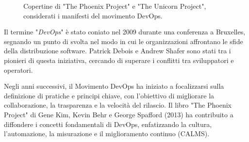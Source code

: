 \begin{figure}[h]
    \centering
    \hspace{30px}
    \caption{Copertine di "The Phoenix Project" e "The Unicorn Project", considerati i manifesti del movimento DevOps.}
    \label{fig:cha1:jerez}
\end{figure}

Il termine "{\em DevOps}" è stato coniato nel 2009 durante una conferenza a Bruxelles, segnando un punto di svolta nel modo in cui le organizzazioni affrontano le sfide della distribuzione software. Patrick Debois e Andrew Shafer sono stati tra i pionieri di questa iniziativa, cercando di superare i conflitti tra sviluppatori e operatori.

Negli anni successivi, il Movimento DevOps ha iniziato a focalizzarsi sulla definizione di pratiche e principi chiave, con l'obiettivo di migliorare la collaborazione, la trasparenza e la velocità del rilascio. Il libro "The Phoenix Project" \cite{phoenix} di Gene Kim, Kevin Behr e George Spafford (2013) ha contribuito a diffondere i concetti fondamentali di DevOps, enfatizzando la cultura, l'automazione, la misurazione e il miglioramento continuo (CALMS).

